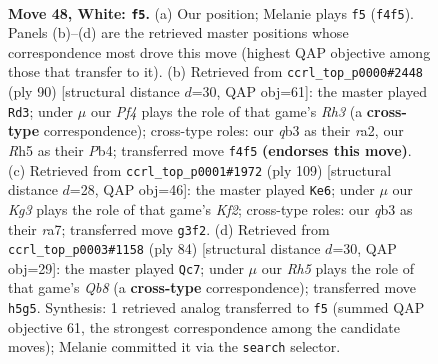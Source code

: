 \documentclass[11pt]{article}
\begin{document}
\clearpage

\begin{figure}[p]\centering
\begin{subfigure}{0.46\textwidth}\centering
\resizebox{\linewidth}{!}{%
\newchessgame
\chessboard[
  setfen={8/pp4k1/8/7R/5P2/bq3BK1/8/8 w - - 1 48},
  showmover=false,
  pgfstyle=straightmove, color=movearrow, markmove={f4-f5}
]}
\caption{}
\end{subfigure}\hfill
\begin{subfigure}{0.46\textwidth}\centering
\resizebox{\linewidth}{!}{%
\newchessgame
\chessboard[
  setfen={8/5k2/p7/5pp1/1P6/7R/r2B3K/8 w - - 0 46},
  showmover=false,
  pgfstyle=straightmove, color=movearrow, markmove={h3-d3}
]}
\caption{}
\end{subfigure}
\\[4pt]
\begin{subfigure}{0.46\textwidth}\centering
\resizebox{\linewidth}{!}{%
\newchessgame
\chessboard[
  setfen={8/R3bk2/1p6/8/1r3P2/3B2K1/8/8 b - - 0 55},
  showmover=false,
  pgfstyle=straightmove, color=movearrow, markmove={f7-e6}
]}
\caption{}
\end{subfigure}\hfill
\begin{subfigure}{0.46\textwidth}\centering
\resizebox{\linewidth}{!}{%
\newchessgame
\chessboard[
  setfen={1Q6/6bk/8/6qp/4P3/6B1/6K1/8 w - - 0 43},
  showmover=false,
  pgfstyle=straightmove, color=movearrow, markmove={b8-c7}
]}
\caption{}
\end{subfigure}
\caption{\textbf{Move 48, White: \texttt{f5}.} (a) Our position; Melanie plays \texttt{f5} (\texttt{f4f5}). Panels (b)--(d) are the retrieved master positions whose correspondence most drove this move (highest QAP objective among those that transfer to it). (b) Retrieved from \texttt{ccrl\_top\_p0000\#2448} (ply 90) [structural distance $d$=30, QAP obj=61]: the master played \texttt{Rd3}; under $\mu$ our \emph{Pf4} plays the role of that game's \emph{Rh3} (a \textbf{cross-type} correspondence); cross-type roles: our \emph{q}b3 as their \emph{r}a2, our \emph{R}h5 as their \emph{P}b4; transferred move \texttt{f4f5} \textbf{(endorses this move)}. (c) Retrieved from \texttt{ccrl\_top\_p0001\#1972} (ply 109) [structural distance $d$=28, QAP obj=46]: the master played \texttt{Ke6}; under $\mu$ our \emph{Kg3} plays the role of that game's \emph{Kf2}; cross-type roles: our \emph{q}b3 as their \emph{r}a7; transferred move \texttt{g3f2}. (d) Retrieved from \texttt{ccrl\_top\_p0003\#1158} (ply 84) [structural distance $d$=30, QAP obj=29]: the master played \texttt{Qc7}; under $\mu$ our \emph{Rh5} plays the role of that game's \emph{Qb8} (a \textbf{cross-type} correspondence); transferred move \texttt{h5g5}. Synthesis: 1 retrieved analog transferred to \texttt{f5} (summed QAP objective 61, the strongest correspondence among the candidate moves); Melanie committed it via the \texttt{search} selector.}
\label{fig:thought-m94}
\end{figure}
\end{document}
